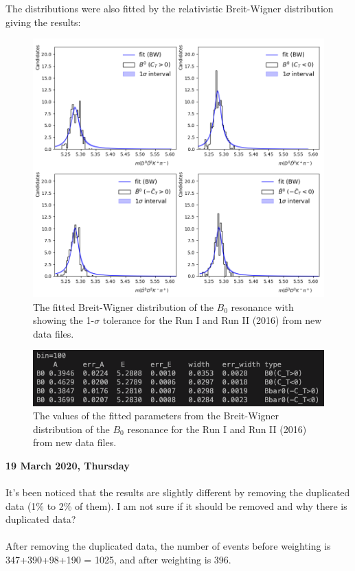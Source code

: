 \clearpage
\noindent The distributions were also fitted by the relativistic Breit-Wigner distribution giving the results:
\begin{figure}[h]
\center
\includegraphics*[width=0.76\linewidth]{LHCb_Run1_AND_2/invmass_B0_fit_tp_bw}
\caption{The fitted Breit-Wigner distribution of the $B_0$ resonance with showing the 1-$\sigma$ tolerance for the Run I and Run II (2016) from new data files.}
\label{fit_B0_run12_bw}
\end{figure}
\begin{figure}[h]
\center
\includegraphics*[width=0.76\linewidth]{LHCb_Run1_AND_2/B0_fit_bw}
\caption{The values of the fitted parameters from the Breit-Wigner distribution of the $B_0$ resonance for the Run I and Run II (2016) from new data files.}
\label{fit_B0_run12_bw}
\end{figure}
\clearpage
\noindent\textbf{19 March 2020, Thursday}
\\
\\
\label{rm_dup}
It's been noticed that the results are slightly different by removing the duplicated data (1\% to 2\% of them). I am not sure if it should be removed and why there is duplicated data?
\\
\\
After removing the duplicated data, the number of events before weighting is 347+390+98+190 = 1025, and after weighting is 396.
\\
\\
